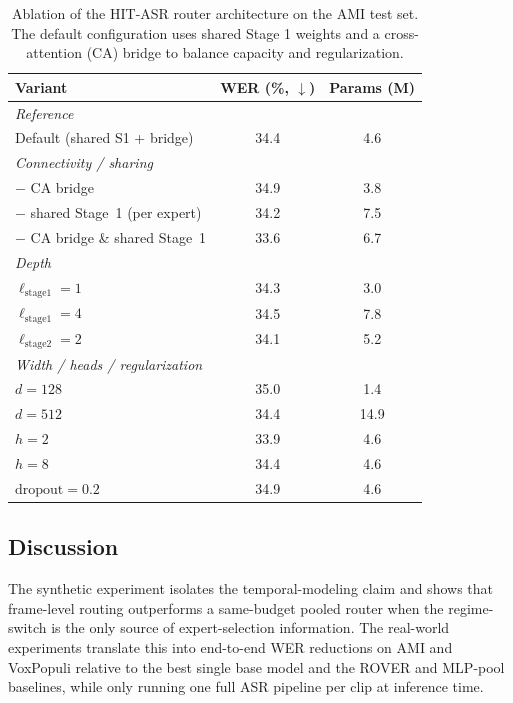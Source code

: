 \documentclass[journal]{IEEEtran}
\begin{document}
\begin{table}[t]
\centering
\caption{Ablation of the HIT-ASR router architecture on the AMI test set. The default configuration uses shared Stage 1 weights and a cross-attention (CA) bridge to balance capacity and regularization.}
\label{tab:arch_ablation}
\small
\begin{tabular}{p{4.1cm} S[table-format=2.1] S[table-format=2.1]}
\toprule
\textbf{Variant} & {\textbf{WER (\%, $\downarrow$)}} & {\textbf{Params (M)}} \\
\midrule
\textit{Reference} & & \\
Default (shared S1 + bridge) & 34.4 & 4.6 \\
\midrule
\textit{Connectivity / sharing} & & \\
$-$ CA bridge & 34.9 & 3.8 \\
$-$ shared Stage~1 (per expert) & 34.2 & 7.5 \\
$-$ CA bridge \& shared Stage~1 & 33.6 & 6.7 \\
\midrule
\textit{Depth} & & \\
$\ell_{\text{stage1}}=1$ & 34.3 & 3.0 \\
$\ell_{\text{stage1}}=4$ & 34.5 & 7.8 \\
$\ell_{\text{stage2}}=2$ & 34.1 & 5.2 \\
\midrule
\textit{Width / heads / regularization} & & \\
$d=128$ & 35.0 & 1.4 \\
$d=512$ & 34.4 & 14.9 \\
$h=2$ & 33.9 & 4.6 \\
$h=8$ & 34.4 & 4.6 \\
$\text{dropout}=0.2$ & 34.9 & 4.6 \\

\bottomrule
\end{tabular}
\end{table}


\subsection{Discussion}
\label{subsec:discussion}

The synthetic experiment isolates the temporal-modeling claim and
shows that frame-level routing outperforms a same-budget pooled
router when the regime-switch is the only source of expert-selection
information. The real-world experiments translate this into
end-to-end WER reductions on AMI and VoxPopuli relative to the best
single base model and the ROVER and MLP-pool baselines, while only
running one full ASR pipeline per clip at inference time.
\end{document}
